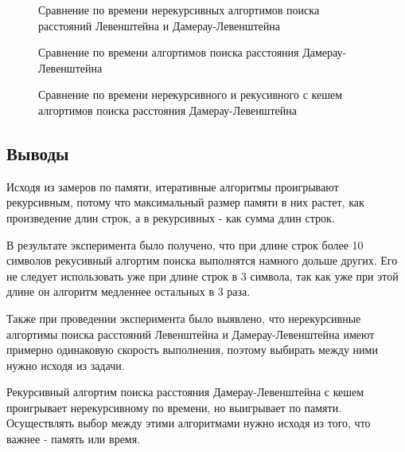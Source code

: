 \begin{figure}[!h]
	\centering
	\captionsetup{justification=centering}
    \def\svgscale{0.5}
	
	\caption{Сравнение по времени нерекурсивных алгортимов поиска расстояний Левенштейна и Дамерау-Левенштейна}
	\label{fig:r2}
\end{figure}

\begin{figure}[!h]
	\centering
	\captionsetup{justification=centering}
    \def\svgscale{0.5}
	
	\caption{Сравнение по времени алгортимов поиска расстояния Дамерау-Левенштейна}
	\label{fig:r3}
\end{figure}

\begin{figure}[!h]
	\centering
	\captionsetup{justification=centering}
    \def\svgscale{0.45}
	
	\caption{Сравнение по времени нерекурсивного и рекусивного с кешем алгортимов поиска расстояния Дамерау-Левенштейна}
	\label{fig:r4}
\end{figure}
\pagebreak
\pagebreak


\subsection{Выводы}
Исходя из замеров по памяти, итеративные алгоритмы проигрывают рекурсивным, 
потому что максимальный размер памяти в них растет, как произведение длин строк, а в рекурсивных - как сумма длин строк.

В результате эксперимента было получено, что при длине строк более 10 символов рекусивный алгортим поиска выполнятся намного
дольше других. Его не следует использовать уже при длине строк в 3 символа, так как уже при этой длине он алгоритм медленнее остальных в 3 раза.

Также при проведении эксперимента было выявлено, что нерекурсивные алгортимы поиска расстояний Левенштейна и Дамерау-Левенштейна
имеют примерно одинаковую скорость выполнения, поэтому выбирать между ними нужно исходя из задачи.

Рекурсивный алгортим поиска расстояния Дамерау-Левенштейна с кешем проигрывает нерекурсивному по времени, но выигрывает по памяти.
Осуществлять выбор между этими алгоритмами нужно исходя из того, что важнее - память или время.

\pagebreak